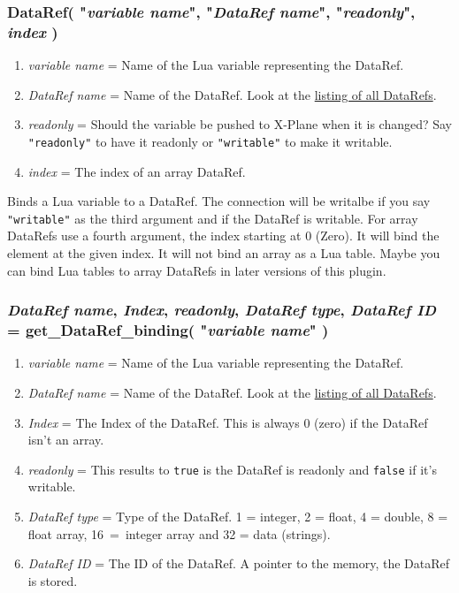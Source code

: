 \documentclass[11pt,parskip=half,a4paper]{scrartcl}
\begin{document}
\subsubsection{DataRef( "\emph{variable name}", "\emph{DataRef name}", "\emph{readonly}", \emph{index} )}

\begin{enumerate}
	\item \emph{variable name} = Name of the Lua variable representing the DataRef.
	\item \emph{DataRef name} = Name of the DataRef. Look at the \href{http://www.xsquawkbox.net/xpsdk/docs/DataRefs.html}{listing of all DataRefs}.
	\item \emph{readonly} = Should the variable be pushed to X-Plane when it is changed? Say \verb|"readonly"| to have it readonly or \verb|"writable"| to make it writable.
	\item \emph{index} = The index of an array DataRef.
\end{enumerate}

Binds a Lua variable to a DataRef. The connection will be writalbe if you say \verb|"writable"| as the third argument and if the DataRef is writable. For array DataRefs use a fourth argument, the index starting at 0 (Zero). It will bind the element at the given index. It will not bind an array as a Lua table. Maybe you can bind Lua tables to array DataRefs in later versions of this plugin.

\subsubsection{\emph{DataRef name}, \emph{Index}, \emph{readonly}, \emph{DataRef type}, \emph{DataRef ID} = get\_DataRef\_binding( "\emph{variable name}" )}

\begin{enumerate}
	\item \emph{variable name} = Name of the Lua variable representing the DataRef.
	\item \emph{DataRef name} = Name of the DataRef. Look at the \href{http://www.xsquawkbox.net/xpsdk/docs/DataRefs.html}{listing of all DataRefs}.
	\item \emph{Index} = The Index of the DataRef. This is always 0 (zero) if the DataRef isn't an array.
	\item \emph{readonly} = This results to \verb|true| is the DataRef is readonly and \verb|false| if it's writable.
	\item \emph{DataRef type} = Type of the DataRef. 1 = integer, 2 = float, 4 = double, 8 = float array, 16~=~integer array and 32 = data (strings).
	\item \emph{DataRef ID} = The ID of the DataRef. A pointer to the memory, the DataRef is stored.
\end{enumerate}
\end{document}
